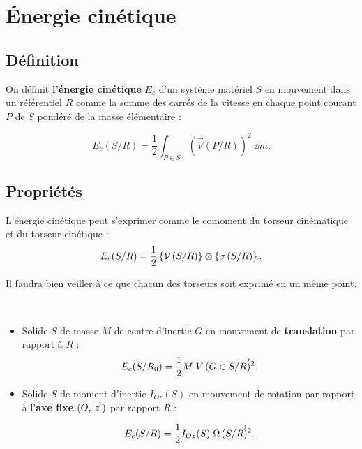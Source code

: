 \documentclass[10pt,fleqn]{article} %
\begin{document}
\section{Énergie cinétique}
\subsection{Définition}
\begin{defi}
On définit \textbf{l'énergie cinétique} $E_c$ d'un système matériel $S$ en mouvement dans un référentiel $R$ comme la somme des carrés de la vitesse en chaque point courant $P$ de $S$ pondéré de la masse élémentaire :

$$
E_c(S/R)=\frac{1}{2}\displaystyle{\int_{P\in S}} \left(\overrightarrow{V}(P/R)\right)^2\;\dd m.
$$

\end{defi}

\subsection{Propriétés}

\begin{prop}
L'énergie cinétique peut s'exprimer comme le comoment du torseur cinématique et du torseur cinétique :
$$E_c(S/R)=\frac{1}{2}\left\{\mathcal{V} \left(S/R \right) \right\}\otimes \left\{\sigma \left(S/R \right) \right\}.
$$
\end{prop}

\begin{warn}
Il faudra bien veiller à ce que chacun des torseurs soit exprimé en un même point.
\end{warn}

\begin{prop} ~\\

\begin{itemize}
\item Solide $S$ de masse $M$ de centre d'inertie $G$ en mouvement de \textbf{translation} par rapport à $R$ :
$$
E_c(S/R_0)=\frac{1}{2}M \; \overrightarrow{V\left( {G} \in {S}/{R}\right)}^2.
$$

\item Solide $S$ de moment d'inertie $I_{Oz}(S)$ en mouvement de rotation par rapport à l'\textbf{axe fixe} $\left(O,\overrightarrow{{z}}\right)$ par rapport $R$ :

$$
E_c(S/R)=\frac{1}{2}I_{Oz}(S)\; \overrightarrow{\Omega\left( {S}/{R}\right)}^2.
$$

\end{itemize}
\end{prop}
\end{document}
